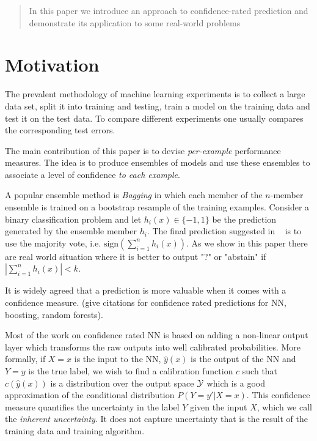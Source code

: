 \documentclass{article}
\begin{document}
\printAffiliationsAndNotice{\icmlEqualContribution} %

\begin{abstract}
In this paper we introduce an approach to confidence-rated prediction and demonstrate its application to some real-world problems
\end{abstract}

\newcommand{\cD}{{\cal D}}
\newcommand{\cT}{{\cal T}}
\newcommand{\cN}{{\cal N}}
\newcommand{\cA}{{\cal A}}
\newcommand{\cE}{{\cal E}}
\newcommand{\cF}{{\cal F}}
\newcommand{\cX}{{\cal X}}
\newcommand{\cY}{{\cal Y}}

\section{Motivation}
\label{sec:motivation}

The prevalent methodology of machine learning experiments is to collect a large data set, split it into training and testing, train a model on the training data and test it on the test data.  To compare different experiments one usually compares the corresponding test errors.

The main contribution of this paper is to devise {\em per-example} performance measures. The idea is to produce ensembles of models and use these ensembles to associate a level of confidence {\em to each example}.

A popular ensemble method is {\em Bagging} \cite{} in which each member of the $n$-member ensemble is trained on a bootstrap resample of the training examples.  Consider a binary classification problem and let $h_i(x) \in \{-1,1\}$ be the prediction generated by the ensemble member $h_i$.
The final prediction suggested in ~\cite{bagging} is to use the majority vote, i.e.
$\mbox{sign} (\sum_{i=1}^{n} h_i(x))$. As we show in this paper there are real world situation 
where it is better to output "?" or "abstain" if $|\sum_{i=1}^{n} h_i(x)| < k$. 

\iffalse
It is widely agreed that a prediction is more valuable when it comes with a confidence measure. (give citations for confidence rated predictions for NN, boosting, random forests).

Most of the work on confidence rated NN is based on adding a non-linear output layer which transforms the raw outputs into well calibrated probabilities. More formally, if $X=x$ is the input to the NN, $\hat{y}(x)$ is the output of the NN and $Y=y$ is the true label, we wish to find a calibration function $c$ such that $c(\hat{y}(x))$
is a distribution over the output space $\cY$ which is a good approximation of the conditional distribution 
$P(Y=y'|X=x)$. This confidence measure quantifies the uncertainty in the label $Y$ given the input $X$, which we call the {\em inherent uncertainty}. It does not capture uncertainty that is the result of the training data and training algorithm.
\end{document}
